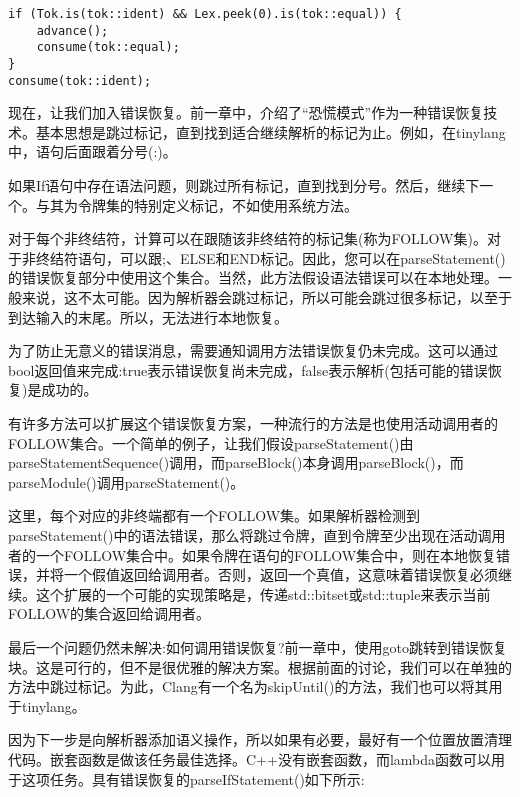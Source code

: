 \begin{lstlisting}[caption={}]
if (Tok.is(tok::ident) && Lex.peek(0).is(tok::equal)) {
	advance();
	consume(tok::equal);
}
consume(tok::ident);
\end{lstlisting}

现在，让我们加入错误恢复。前一章中，介绍了“恐慌模式”作为一种错误恢复技术。基本思想是跳过标记，直到找到适合继续解析的标记为止。例如，在tinylang中，语句后面跟着分号(:)。\par

如果If语句中存在语法问题，则跳过所有标记，直到找到分号。然后，继续下一个。与其为令牌集的特别定义标记，不如使用系统方法。\par

对于每个非终结符，计算可以在跟随该非终结符的标记集(称为FOLLOW集)。对于非终结符语句，可以跟;、ELSE和END标记。因此，您可以在parseStatement()的错误恢复部分中使用这个集合。当然，此方法假设语法错误可以在本地处理。一般来说，这不太可能。因为解析器会跳过标记，所以可能会跳过很多标记，以至于到达输入的末尾。所以，无法进行本地恢复。\par

为了防止无意义的错误消息，需要通知调用方法错误恢复仍未完成。这可以通过bool返回值来完成:true表示错误恢复尚未完成，false表示解析(包括可能的错误恢复)是成功的。\par

有许多方法可以扩展这个错误恢复方案，一种流行的方法是也使用活动调用者的FOLLOW集合。一个简单的例子，让我们假设parseStatement()由parseStatementSequence()调用，而parseBlock()本身调用parseBlock()，而parseModule()调用parseStatement()。\par

这里，每个对应的非终端都有一个FOLLOW集。如果解析器检测到parseStatement()中的语法错误，那么将跳过令牌，直到令牌至少出现在活动调用者的一个FOLLOW集合中。如果令牌在语句的FOLLOW集合中，则在本地恢复错误，并将一个假值返回给调用者。否则，返回一个真值，这意味着错误恢复必须继续。这个扩展的一个可能的实现策略是，传递std::bitset或std::tuple来表示当前FOLLOW的集合返回给调用者。\par

最后一个问题仍然未解决:如何调用错误恢复?前一章中，使用goto跳转到错误恢复块。这是可行的，但不是很优雅的解决方案。根据前面的讨论，我们可以在单独的方法中跳过标记。为此，Clang有一个名为skipUntil()的方法，我们也可以将其用于tinylang。\par

因为下一步是向解析器添加语义操作，所以如果有必要，最好有一个位置放置清理代码。嵌套函数是做该任务最佳选择。C++没有嵌套函数，而lambda函数可以用于这项任务。具有错误恢复的parseIfStatement()如下所示:\par

